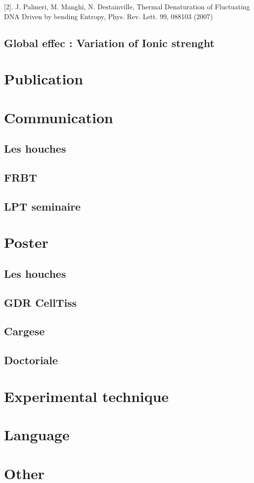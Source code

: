 [2]. 	J. Palmeri, M. Manghi, N. Destainville, Thermal Denaturation of Fluctuating DNA Driven by bending Entropy, Phys. Rev. Lett. 99, 088103 (2007)

\subsection{Global effec : Variation of Ionic strenght}

\section{Publication}
\section{Communication}
\subsection{Les houches}
\subsection{FRBT}
\subsection{LPT seminaire}
\section{Poster}
\subsection{Les houches}
\subsection{GDR CellTiss}
\subsection{Cargese}
\subsection{Doctoriale}


\section{Experimental technique}
\section{Language}
\section{Other}


